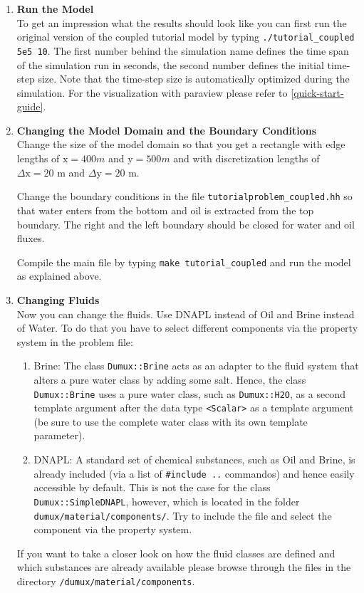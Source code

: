 \begin{enumerate}

\item \textbf{Run the Model} \\
To get an impression what the results should look like you can first run the original version of the coupled tutorial model by typing  \texttt{./tutorial\_coupled 5e5 10}. The first number behind the simulation name defines the time span of the simulation run in seconds, the second number defines the initial time-step size. Note that the time-step size is automatically optimized during the simulation. For the visualization with paraview please refer to \ref{quick-start-guide}.\\

\item \textbf{Changing the Model Domain and the Boundary Conditions} \\
  Change the size of the model domain so that you get a rectangle with
  edge lengths of $\text{x} = 400 m$ and $\text{y} = 500 m$ and with
  discretization lengths of $\Delta \text{x} = 20$ m and $\Delta
  \text{y} = 20$ m.
  
  Change the boundary conditions in the file
  \texttt{tutorialproblem\_coupled.hh} so that water enters from the
  bottom and oil is extracted from the top boundary. The right and the
  left boundary should be closed for water and oil fluxes. 

  Compile the main file by typing \texttt{make tutorial\_coupled} and
  run the model as explained above.


\item \textbf{Changing Fluids} \\
Now you can change the fluids. Use DNAPL instead of Oil and Brine instead of Water. To do that you have to select different components via the property system in the problem file:
\begin{enumerate}
 \item Brine: The class \texttt{Dumux::Brine} acts as an adapter to the fluid system that alters a pure water class by adding some salt. Hence, the class \texttt{Dumux::Brine} uses a pure water class, such as \texttt{Dumux::H2O}, as a second template argument after the data type \texttt{<Scalar>} as a template argument (be sure to use the complete water class with its own template parameter).
 \item DNAPL: A standard set of chemical substances, such as Oil and Brine, is already included (via a list of \texttt{\#include ..} commandos) and hence easily accessible by default. This is not the case for the class \texttt{Dumux::SimpleDNAPL}, however, which is located in the folder \texttt{dumux/material/components/}. Try to include the file and select the component via the property system.
\end{enumerate}
If you want to take a closer look on how the fluid classes are defined and which substances are already available please browse through the files in the directory
\texttt{/dumux/material/components}.


\end{enumerate}
